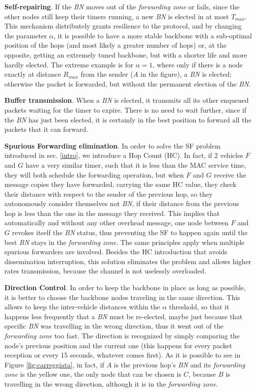 \documentclass{acm_proc_article-sp}
\begin{document}
\textbf{Self-repairing}. If the \textit{BN} moves out of the \textit{forwarding zone} or fails, since the other nodes still keep their timers running, a new \textit{BN} is elected in at most $T_{max}$. This mechanism distributely grants resilience to the protocol, and by changing the parameter $\alpha$, it is possible to have a more stable backbone with a sub-optimal position of the hops (and most likely a greater number of hops) or, at the opposite, getting an extremely tuned backbone, but with a shorter life and more hardly elected. The extreme example is for $\alpha=1$, where only if there is a node exactly at distance $R_{max}$ from the sender ($A$ in the figure), a \textit{BN} is elected; otherwise the packet is forwarded, but without the permanent election of the \textit{BN}.

\textbf{Buffer transmission}. When a \textit{BN} is elected, it transmits all its other enqueued packets waiting for the timer to expire. There is no need to wait further, since if the \textit{BN} has just been elected, it is certainly in the best position to forward all the packets that it can forward.

\textbf{Spurious Forwarding elimination}. In order to solve the SF problem introduced in sec. \ref{intro}, we introduce a Hop Count (HC). In fact, if 2 vehicles $F$ and $G$ have a very similar timer, such that it is less than the MAC service time, they will both schedule the forwarding operation, but when $F$ and $G$ receive the message copies they have forwarded, carrying the same HC value, they check their distance with respect to the sender of the previous hop, so they autonomously consider themselves not \textit{BN}, if their distance from the previous hop is less than the one in the message they received. This implies that automatically and without any other overhead message, one node between $F$ and $G$ revokes itself the \textit{BN} status, thus preventing the SF to happen again until the best \textit{BN} stays in the \textit{forwarding zone}.
The same principles apply when multiple spurious forwarders are involved. Besides the HC introduction that avoids dissemination interruption, this solution eliminates the problem and allows higher rates transmission, because the channel is not uselessly overloaded.

\textbf{Direction Control}. In order to keep the backbone in place as long as possible, it is better to choose the backbone nodes traveling in the same direction. This allows to keep the inter-vehicle distances within the $\alpha$ threshold, so that it happens less frequently that a \textit{BN} must be re-elected, maybe just because that specific \textit{BN} was travelling in the wrong direction, thus it went out of the \textit{forwarding zone} too fast. The direction is recognized by simply comparing the node's previous position and the current one (this happens for every packet reception or every 15 seconds, whatever comes first). As it is possible to see in Figure \ref{fig:carreggiata}, in fact, if $A$ is the previous hop's \textit{BN} and its \textit{forwarding zone} is the yellow one, the only node that can be chosen is $C$, because $B$ is travelling in the wrong direction, although it is in the \textit{forwarding zone}.
\end{document}
